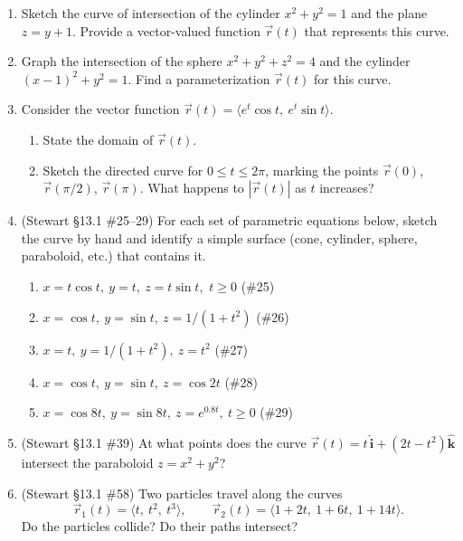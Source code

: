 \documentclass[12pt]{article}
\newcommand{\ihat}{\hat{\textbf{i}}}
\newcommand{\khat}{\hat{\textbf{k}}}
\begin{document}
\begin{enumerate}
\begin{enumerate}
        \item Sketch the curve of intersection of the cylinder $x^2 + y^2 = 1$ and the plane $z = y + 1$. Provide a vector-valued function $\vec{r}(t)$ that represents this curve.
        \item Graph the intersection of the sphere $x^2 + y^2 + z^2 = 4$ and the cylinder $(x-1)^2 + y^2 = 1$. Find a parameterization $\vec{r}(t)$ for this curve.
        \item Consider the vector function $\vec{r}(t) = \langle e^t \cos t,\ e^t \sin t \rangle$.
        \begin{enumerate}
            \item State the domain of $\vec{r}(t)$.
            \item Sketch the directed curve for $0 \leq t \leq 2\pi$, marking the points $\vec{r}(0)$, $\vec{r}(\pi/2)$, $\vec{r}(\pi)$. What happens to $|\vec{r}(t)|$ as $t$ increases?
        \end{enumerate}
        \item (Stewart \S13.1 \#25--29) For each set of parametric equations below, sketch the curve by hand and identify a simple surface (cone, cylinder, sphere, paraboloid, etc.) that contains it.
        \begin{enumerate}
            \item $x = t\cos t,\ y = t,\ z = t\sin t$,\ $t\geq 0$ \quad (\#25)
            \item $x = \cos t,\ y = \sin t,\ z = 1/(1+t^2)$ \quad (\#26)
            \item $x = t,\ y = 1/(1+t^2),\ z = t^2$ \quad (\#27)
            \item $x = \cos t,\ y = \sin t,\ z = \cos 2t$ \quad (\#28)
            \item $x = \cos 8t,\ y = \sin 8t,\ z = e^{0.8t},\ t\geq 0$ \quad (\#29)
        \end{enumerate}
        \item (Stewart \S13.1 \#39) At what points does the curve $\vec r(t) = t\,\ihat + (2t - t^2)\khat$ intersect the paraboloid $z = x^2 + y^2$?
        \item (Stewart \S13.1 \#58) Two particles travel along the curves
        \[ \vec r_1(t) = \langle t,\ t^2,\ t^3\rangle, \qquad \vec r_2(t) = \langle 1+2t,\ 1+6t,\ 1+14t\rangle. \]
        Do the particles collide? Do their paths intersect?


\end{enumerate}
\end{enumerate}
\end{document}

